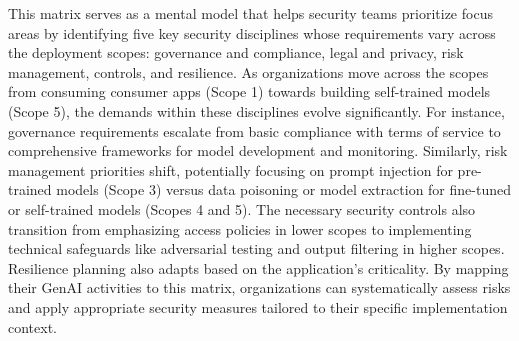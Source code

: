 This matrix serves as a mental model\cite{noauthor_securing_nodate} that helps security teams prioritize focus areas by identifying five key security disciplines whose requirements vary across the deployment scopes: governance and compliance, legal and privacy, risk management, controls, and resilience\cite{noauthor_securing_2023}\cite{noauthor_securing_nodate}. As organizations move across the scopes from consuming consumer apps (Scope 1) towards building self-trained models (Scope 5), the demands within these disciplines evolve significantly. For instance, governance requirements escalate from basic compliance with terms of service to comprehensive frameworks for model development and monitoring. Similarly, risk management priorities shift, potentially focusing on prompt injection for pre-trained models (Scope 3) versus data poisoning or model extraction for fine-tuned or self-trained models (Scopes 4 and 5). The necessary security controls also transition from emphasizing access policies in lower scopes to implementing technical safeguards like adversarial testing and output filtering in higher scopes. Resilience planning also adapts based on the application's criticality. By mapping their GenAI activities to this matrix, organizations can systematically assess risks and apply appropriate security measures tailored to their specific implementation context.

